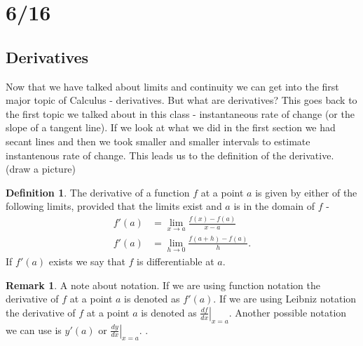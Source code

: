 \documentclass[12pt,reqno]{article}
\theoremstyle{definition}
\newtheorem*{Definition}{Definition}
\newtheorem*{Remark}{Remark}
\begin{document}
\section{6/16}

\subsection{Derivatives} 

Now that we have talked about limits and continuity we can get into the first major topic of Calculus - derivatives. But what are derivatives? This goes back to the first topic we talked about in this class - instantaneous rate of change (or the slope of a tangent line). If we look at what we did in the first section we had secant lines and then we took smaller and smaller intervals to estimate instantenous rate of change. This leads us to the definition of the derivative. (draw a picture)

\begin{Definition}
	The derivative of a function $f$ at a point $a$ is given by either of the following limits, provided that the limits exist and $a$ is in the domain of $f$ - \begin{align}
		f'(a) &= \lim_{x \to a} \frac{f(x) - f(a)}{x - a} \\
		f'(a) &= \lim_{h \to 0} \frac{f(a + h) - f(a)} {h}.
	\end{align}
	If $f'(a)$ exists we say that $f$ is differentiable at $a$. 
\end{Definition} 

\begin{Remark}
	A note about notation. If we are using function notation the derivative of $f$ at a point $a$ is denoted as $f'(a)$. If we are using Leibniz notation the derivative of $f$ at a point $a$ is denoted as $\left.\frac{df}{dx}\right|_{x = a}$. Another possible notation we can use is $y'(a)$ or $\left.\frac{dy}{dx}\right|_{x = a}$. .   
\end{Remark}
\end{document}
